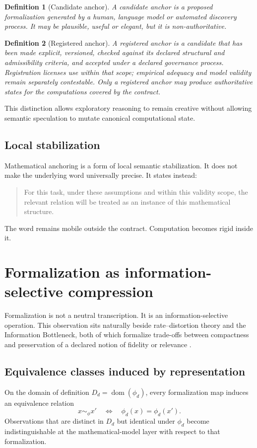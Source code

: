 \documentclass[11pt,a4paper]{article}
\newtheorem{definition}{Definition}
\begin{document}
\begin{definition}[Candidate anchor]
A candidate anchor is a proposed formalization generated by a human, language model or automated discovery process. It may be plausible, useful or elegant, but it is non-authoritative.
\end{definition}

\begin{definition}[Registered anchor]
A registered anchor is a candidate that has been made explicit, versioned, checked against its declared structural and admissibility criteria, and accepted under a declared governance process. Registration licenses use within that scope; empirical adequacy and model validity remain separately contestable. Only a registered anchor may produce authoritative states for the computations covered by the contract.
\end{definition}

This distinction allows exploratory reasoning to remain creative without allowing semantic speculation to mutate canonical computational state.

\subsection{Local stabilization}
Mathematical anchoring is a form of local semantic stabilization. It does not make the underlying word universally precise. It states instead:

\begin{quote}
For this task, under these assumptions and within this validity scope, the relevant relation will be treated as an instance of this mathematical structure.
\end{quote}

The word remains mobile outside the contract. Computation becomes rigid inside it.

\section{Formalization as information-selective compression}
Formalization is not a neutral transcription. It is an information-selective operation. This observation sits naturally beside rate--distortion theory and the Information Bottleneck, both of which formalize trade-offs between compactness and preservation of a declared notion of fidelity or relevance \cite{shannon1959,tishby2000}.

\subsection{Equivalence classes induced by representation}
On the domain of definition $D_d=\operatorname{dom}(\phi_d)$, every formalization map induces an equivalence relation
\begin{equation}
x\sim_{\phi}x' \quad \Longleftrightarrow \quad \phi_d(x)=\phi_d(x').
\end{equation}
Observations that are distinct in $D_d$ but identical under $\phi_d$ become indistinguishable at the mathematical-model layer with respect to that formalization.
\end{document}
